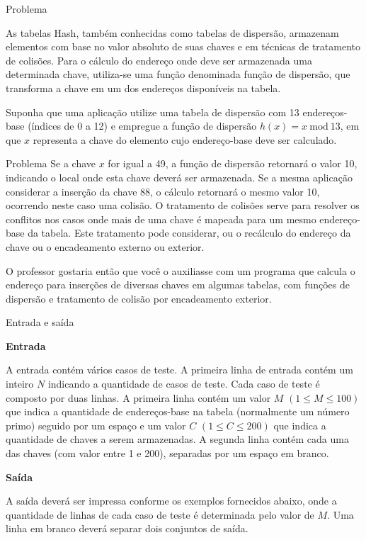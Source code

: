 
\begin{frame}[fragile]{Problema}

As tabelas Hash, também conhecidas como tabelas de dispersão, armazenam elementos com base no valor absoluto de suas chaves e em técnicas de tratamento de colisões. Para o cálculo do endereço onde deve ser armazenada uma determinada chave, utiliza-se uma função denominada função de dispersão, que transforma a chave em um dos endereços disponíveis na tabela.

Suponha que uma aplicação utilize uma tabela de dispersão com 13 endereços-base (índices de 0 a 12) e empregue a função de dispersão $h(x) = x\ \mbox{mod}\ 13$, em que $x$ representa a chave do elemento cujo endereço-base deve ser calculado.
\end{frame}

\begin{frame}[fragile]{Problema}
Se a chave $x$ for igual a 49, a função de dispersão retornará o valor 10, indicando o local onde esta chave deverá ser armazenada. Se a mesma aplicação considerar a inserção da chave 88, o cálculo retornará o mesmo valor 10, ocorrendo neste caso uma colisão. O tratamento de colisões serve para resolver os conflitos nos casos onde mais de uma chave é mapeada para um mesmo endereço-base da tabela. Este tratamento pode considerar, ou o recálculo do endereço da chave ou o encadeamento externo ou exterior.

O professor gostaria então que você o auxiliasse com um programa que calcula o endereço para inserções de diversas chaves em algumas tabelas, com funções de dispersão e tratamento de colisão por encadeamento exterior.

\end{frame}

\begin{frame}[fragile]{Entrada e saída}

\textbf{Entrada}

A entrada contém vários casos de teste. A primeira linha de entrada contém um inteiro $N$ indicando 
a quantidade de casos de teste. Cada caso de teste é composto por duas linhas. A primeira linha 
contém um valor $M$ $(1\leq M\leq 100)$ que indica a quantidade de endereços-base na tabela 
(normalmente um número primo) seguido por um espaço e um valor $C$ $(1\leq C\leq 200)$ que indica a 
quantidade de chaves a serem armazenadas. A segunda linha contém cada uma das chaves (com valor 
entre 1 e 200), separadas por um espaço em branco.

\textbf{Saída}

A saída deverá ser impressa conforme os exemplos fornecidos abaixo, onde a quantidade de linhas de cada caso de teste é determinada pelo valor de $M$. Uma linha em branco deverá separar dois conjuntos de saída.

\end{frame}

